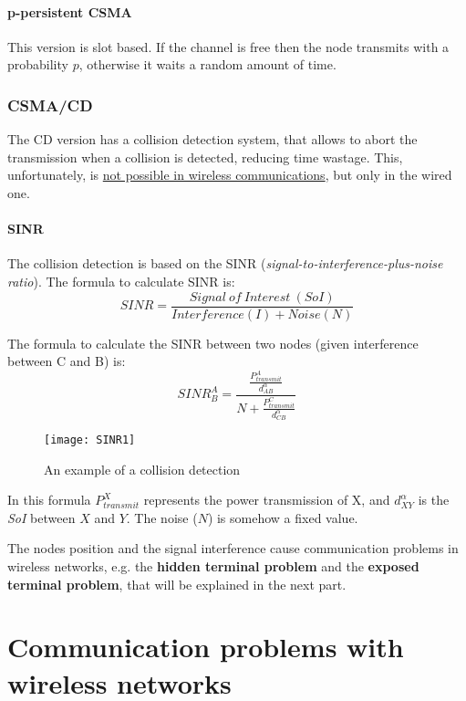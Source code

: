 \paragraph*{p-persistent CSMA} This version is slot based. If the channel is
free then the node transmits with a probability $p$, otherwise it waits a random
amount of time.

\subsubsection{CSMA/CD}

The CD version has a collision detection system, that allows to abort the
transmission when a collision is detected, reducing time wastage. This,
unfortunately, is \underline{not possible in wireless communications}, but only
in the wired one.

\paragraph*{SINR} The collision detection is based on the SINR
(\textit{signal-to-interference-plus-noise ratio}). The formula to calculate
SINR is:
\begin{equation}
SINR = \frac{Signal\ of\ Interest\ (SoI)}{Interference(I) + Noise(N)}
\end{equation}

The formula to calculate the SINR between two nodes (given interference between
C and B) is:
\begin{equation}
SINR^{A}_{B} = \frac{\frac{P^{A}_{transmit}}{d^{\alpha}_{AB}}}{N + \frac{P^{C}_{transmit}}{d^{\alpha}_{CB}}}
\end{equation}

\begin{figure}[t]
  \centering
  \texttt{[image: SINR1]}
  \caption{An example of a collision detection}
\end{figure}

In this formula $P^{X}_{transmit}$ represents the power transmission of X, and
$d^{\alpha}_{XY}$ is the \textit{SoI} between $X$ and $Y$. The noise ($N$) is
somehow a fixed value.

The nodes position and the signal interference cause communication problems in
wireless networks, e.g. the \textbf{hidden terminal problem} and the \textbf{
  exposed terminal problem}, that will be explained in the next part.

\section{Communication problems with wireless networks}

